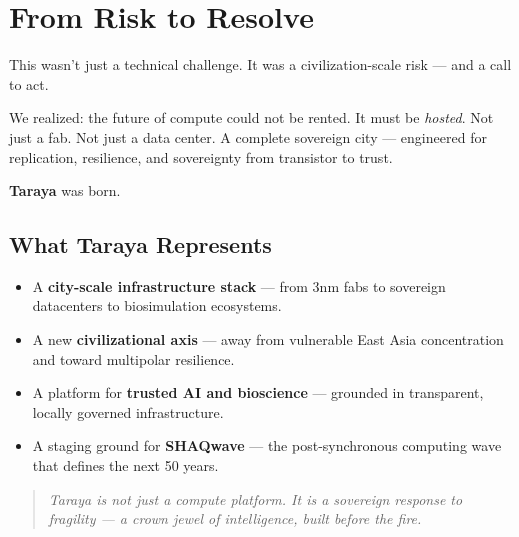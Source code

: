 \documentclass[11pt]{article}
\begin{document}
\section*{From Risk to Resolve}

This wasn't just a technical challenge. It was a civilization-scale risk — and a call to act.

We realized: the future of compute could not be rented. It must be \textit{hosted}. Not just a fab. Not just a data center. A complete sovereign city — engineered for replication, resilience, and sovereignty from transistor to trust.

\textbf{Taraya} was born.

\subsection*{What Taraya Represents}

\begin{itemize}
  \item A \textbf{city-scale infrastructure stack} — from 3nm fabs to sovereign datacenters to biosimulation ecosystems.
  \item A new \textbf{civilizational axis} — away from vulnerable East Asia concentration and toward multipolar resilience.
  \item A platform for \textbf{trusted AI and bioscience} — grounded in transparent, locally governed infrastructure.
  \item A staging ground for \textbf{SHAQwave} — the post-synchronous computing wave that defines the next 50 years.
\end{itemize}

\begin{quote}
\textit{Taraya is not just a compute platform. It is a sovereign response to fragility — a crown jewel of intelligence, built before the fire.}
\end{quote}
\end{document}
